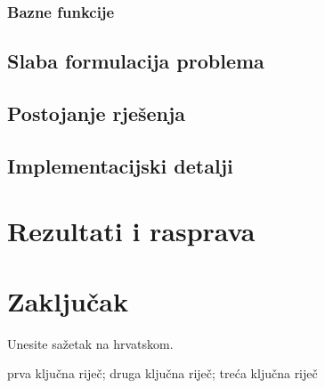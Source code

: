 \documentclass[zavrsnirad]{../fer}
\begin{document}
\subsection{Bazne funkcije}


\section{Slaba formulacija problema}
\label{slabaFormulacija}

\section{Postojanje rješenja}
\label{postojanje}

\section{Implementacijski detalji}
\label{implementacijaOpis}


\chapter{Rezultati i rasprava}
\label{pog:rezultati_i_rasprava}



\chapter{Zaključak}
\label{pog:zakljucak}









\begin{sazetak}
	Unesite sažetak na hrvatskom.

\end{sazetak}

\begin{kljucnerijeci}
	prva ključna riječ; druga ključna riječ; treća ključna riječ
\end{kljucnerijeci}
\end{document}
